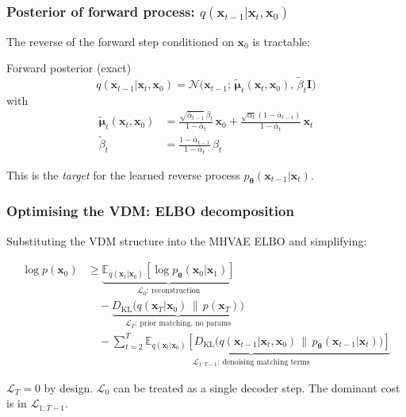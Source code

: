 \documentclass{beamer}
\newcommand{\E}{\mathbb{E}}
\newcommand{\DKL}{D_{\mathrm{KL}}}
\newcommand{\Norm}{\mathcal{N}}
\begin{document}
\begin{frame}
\frametitle{Posterior of forward process: $q(\bm{x}_{t-1}|\bm{x}_t,\bm{x}_0)$}

The reverse of the forward step conditioned on $\bm{x}_0$ is tractable:

\begin{block}{Forward posterior (exact)}
\[
q(\bm{x}_{t-1}|\bm{x}_t,\bm{x}_0)
= \Norm\!\bigl(\bm{x}_{t-1};\,\tilde{\bm{\mu}}_t(\bm{x}_t,\bm{x}_0),\,
  \tilde\beta_t\mathbf{I}\bigr)
\]
with
\begin{align*}
\tilde{\bm{\mu}}_t(\bm{x}_t,\bm{x}_0)
  &= \frac{\sqrt{\bar\alpha_{t-1}}\,\beta_t}{1-\bar\alpha_t}\,\bm{x}_0
   + \frac{\sqrt{\alpha_t}(1-\bar\alpha_{t-1})}{1-\bar\alpha_t}\,\bm{x}_t\\[4pt]
\tilde\beta_t
  &= \frac{1-\bar\alpha_{t-1}}{1-\bar\alpha_t}\,\beta_t
\end{align*}
\end{block}

This is the \emph{target} for the learned reverse process
$p_{\bm{\theta}}(\bm{x}_{t-1}|\bm{x}_t)$.
\end{frame}

\begin{frame}
\frametitle{Optimising the VDM: ELBO decomposition}

Substituting the VDM structure into the MHVAE ELBO and simplifying:

\begin{align*}
\log p(\bm{x}_0)
&\geq
\underbrace{\E_{q(\bm{x}_1|\bm{x}_0)}
  \!\left[\log p_{\bm{\theta}}(\bm{x}_0|\bm{x}_1)\right]}_{\mathcal{L}_0:\ \text{reconstruction}}\\
&\quad -\underbrace{\DKL\!\bigl(q(\bm{x}_T|\bm{x}_0)\,\|\,p(\bm{x}_T)\bigr)}_{\mathcal{L}_T:\ \text{prior matching, no params}}\\
&\quad -\underbrace{\sum_{t=2}^{T}\E_{q(\bm{x}_t|\bm{x}_0)}\!\left[
  \DKL\!\bigl(q(\bm{x}_{t-1}|\bm{x}_t,\bm{x}_0)\,\|\,
             p_{\bm{\theta}}(\bm{x}_{t-1}|\bm{x}_t)\bigr)
\right]}_{\mathcal{L}_{1:T-1}:\ \text{denoising matching terms}}
\end{align*}

$\mathcal{L}_T=0$ by design. $\mathcal{L}_0$ can be treated as a single
decoder step. The dominant cost is in $\mathcal{L}_{1:T-1}$.
\end{frame}
\end{document}
